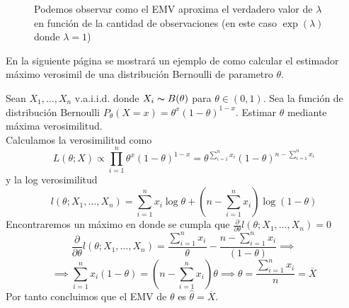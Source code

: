 \begin{figure}[h!]
\begin{center}
        \caption{Podemos observar como el EMV aproxima el verdadero valor de $\lambda$ en función de la cantidad de observaciones (en este caso $\exp(\lambda)$ donde $\lambda = 1$)}

    \end{center}
    \label{fig:exp-log-ver}
\end{figure}

En la siguiente página se mostrará un ejemplo de como calcular el estimador máximo verosimil de una distribución Bernoulli de parametro $\theta$.

\newpage

\begin{exercise}
    Sean $X_1,\dots,X_n$ v.a.i.i.d. donde $X_i \thicksim B(\theta)$ para $\theta \in (0,1)$. Sea la función de distribución Bernoulli $P_\theta(X=x)=\theta^x(1-\theta)^{1-x}$. Estimar $\theta$ mediante máxima verosimilitud. \\
    Calculamos la verosimilitud como
    \[
        L(\theta;X) \propto \prod_{i=1}^{n}\theta^x(1-\theta)^{1-x}=\theta^{\sum_{i=1}^{n}x_i}(1-\theta)^{n-\sum_{i=1}^{n}x_i}
    \]
    y la log verosimilitud
    \[
        l(\theta; X_1,\dots,X_n)=\sum_{i=1}^{n}x_i\log\theta + (n-\sum_{i=1}^{n}x_i)\log(1-\theta)
    \]
    Encontraremos un máximo en donde se cumpla que $\frac{\partial}{\partial\theta}l(\theta;X_1,\dots,X_n)=0$
    \[
        \frac{\partial}{\partial\theta}l(\theta;X_1,\dots,X_n) = \frac{\sum_{i=1}^{n}x_i}{\theta}-\frac{n-\sum_{i=1}^{n}x_i}{(1-\theta)} \implies
    \]
    \[
        \implies \sum_{i=1}^{n}x_i(1-\theta)=(n-\sum_{i=1}^{n}x_i)\theta \implies \theta=\frac{\sum_{i=1}^{n}x_i}{n}=\overline{X}
    \]
    Por tanto concluimos que el EMV de $\theta$ es $\widehat{\theta}=\overline{X}$.
\end{exercise}

